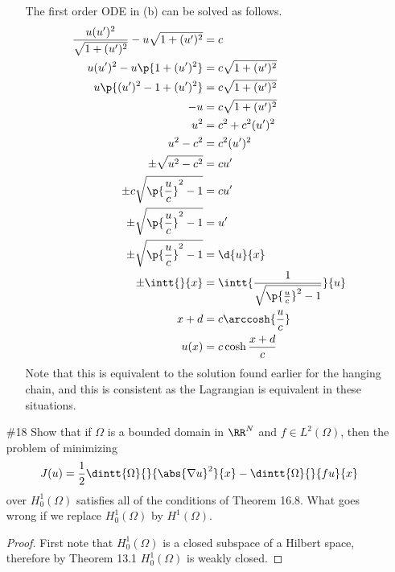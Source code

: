 \documentclass[11pt, oneside]{article}
\begin{document}
\begin{enumerate}
\begin{enumerate}
        The first order ODE in (b) can be solved as follows.
        \begin{align*}
          \frac{u(u')^2}{\sqrt{1 + (u')^2}} - u\sqrt{1 + (u')^2} &= c \\
          u(u')^2 - u\p{1 + (u')^2} &= c\sqrt{1 + (u')^2} \\
          u\p{(u')^2 - 1 + (u')^2} &= c\sqrt{1 + (u')^2} \\
          -u &= c\sqrt{1 + (u')^2} \\
          u^2 &= c^2 + c^2(u')^2 \\
          u^2 - c^2 &= c^2(u')^2 \\
          \pm \sqrt{u^2 - c^2} &= cu' \\
          \pm c\sqrt{\p{\frac{u}{c}}^2 - 1} &= cu' \\
          \pm \sqrt{\p{\frac{u}{c}}^2 - 1} &= u' \\
          \pm \sqrt{\p{\frac{u}{c}}^2 - 1} &= \d{u}{x} \\
          \pm \intt{}{x} &= \intt{\frac{1}{\sqrt{\p{\frac{u}{c}}^2 - 1}}}{u} \\
          x + d &= c \arccosh{\frac{u}{c}} \\
          u(x) &= c \cosh{\frac{x + d}{c}}
        \end{align*}
        Note that this is equivalent to the solution found earlier for the
        hanging chain, and this is consistent as the Lagrangian is equivalent
        in these situations.
    \end{enumerate}

  \pagebreak
  \item[\#18] %
    Show that if $\Omega$ is a bounded domain in $\RR^N$ and $f \in L^2(\Omega)$,
    then the problem of minimizing
    \[
      J(u) = \frac{1}{2} \dintt{\Omega}{}{\abs{\nabla u}^2}{x} - \dintt{\Omega}{}{f u}{x}
    \]
    over $H^1_0(\Omega)$ satisfies all of the conditions of Theorem 16.8.
    What goes wrong if we replace $H^1_0(\Omega)$ by $H^1(\Omega)$.

    \begin{proof}
      First note that $H^1_0(\Omega)$ is a closed subspace of a Hilbert space,
      therefore by Theorem 13.1 $H^1_0(\Omega)$ is weakly closed.


\end{proof}
\end{enumerate}
\end{document}
